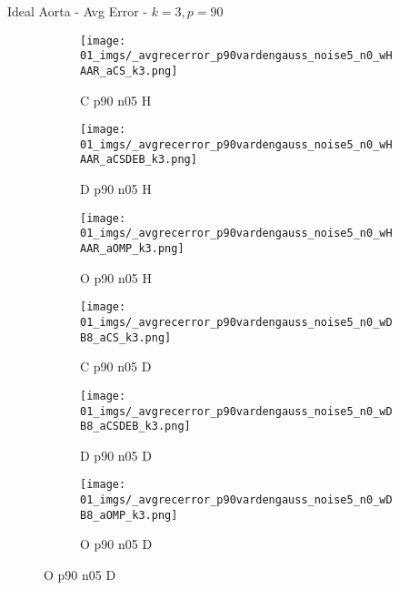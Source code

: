 \begin{frame}{Ideal Aorta - Avg Error - $k=3,p=90$}{}
\begin{figure}
\begin{subfigure}{0.13\textwidth}
\texttt{[image: 01\_imgs/\_avgrecerror\_p90vardengauss\_noise5\_n0\_wHAAR\_aCS\_k3.png]}
\caption*{\tiny C p90 n05 H}
\end{subfigure}
\begin{subfigure}{0.13\textwidth}
\texttt{[image: 01\_imgs/\_avgrecerror\_p90vardengauss\_noise5\_n0\_wHAAR\_aCSDEB\_k3.png]}
\caption*{\tiny D p90 n05 H}
\end{subfigure}
\begin{subfigure}{0.13\textwidth}
\texttt{[image: 01\_imgs/\_avgrecerror\_p90vardengauss\_noise5\_n0\_wHAAR\_aOMP\_k3.png]}
\caption*{\tiny O p90 n05 H}
\end{subfigure}
\begin{subfigure}{0.13\textwidth}
\texttt{[image: 01\_imgs/\_avgrecerror\_p90vardengauss\_noise5\_n0\_wDB8\_aCS\_k3.png]}
\caption*{\tiny C p90 n05 D}
\end{subfigure}
\begin{subfigure}{0.13\textwidth}
\texttt{[image: 01\_imgs/\_avgrecerror\_p90vardengauss\_noise5\_n0\_wDB8\_aCSDEB\_k3.png]}
\caption*{\tiny D p90 n05 D}
\end{subfigure}
\begin{subfigure}{0.13\textwidth}
\texttt{[image: 01\_imgs/\_avgrecerror\_p90vardengauss\_noise5\_n0\_wDB8\_aOMP\_k3.png]}
\caption*{\tiny O p90 n05 D}
\end{subfigure}

\vspace{5pt}


\end{figure}
\end{frame}
